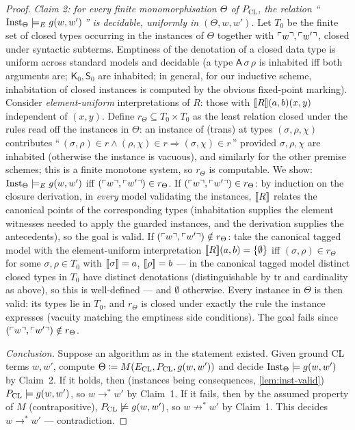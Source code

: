 \begin{proof}
\emph{Claim 2: for every finite monomorphisation $\Theta$ of
$P_{\mathrm{CL}}$, the relation ``\,$\mathrm{Inst}_\Theta
\models_{E} g(w, w')$\,'' is decidable, uniformly in
$(\Theta, w, w')$.}  Let $T_0$ be the finite set of closed types
occurring in the instances of $\Theta$ together with $\ulcorner w \urcorner,
\ulcorner w' \urcorner$, closed under syntactic subterms.  Emptiness of the
denotation of a closed data type is uniform across standard models
and decidable (a type $\mathsf{A}\,\sigma\,\rho$ is inhabited iff
both arguments are; $\mathsf{K}_0, \mathsf{S}_0$ are inhabited; in
general, for our inductive scheme, inhabitation of closed instances
is computed by the obvious fixed-point marking).  Consider
\emph{element-uniform} interpretations of $R$: those with
$[\![ R ]\!](a,b)(x,y)$ independent of $(x,y)$.  Define $r_\Theta
\subseteq T_0 \times T_0$ as the least relation closed under the
rules read off the instances in $\Theta$: an instance of (trans) at
types $(\sigma, \rho, \chi)$ contributes ``\,$(\sigma,\rho) \in r
\wedge (\rho,\chi) \in r \Rightarrow (\sigma,\chi) \in r$\,''
provided $\sigma, \rho, \chi$ are inhabited (otherwise the instance
is vacuous), and similarly for the other premise schemes; this is a
finite monotone system, so $r_\Theta$ is computable.  We show:
$\mathrm{Inst}_\Theta \models_{E} g(w,w')$ iff $(\ulcorner w \urcorner,
\ulcorner w' \urcorner) \in r_\Theta$.  If $(\ulcorner w \urcorner, \ulcorner w' \urcorner) \in r_\Theta$:
by induction on the closure derivation, in \emph{every} model
validating the instances, $[\![ R ]\!]$ relates the canonical points of
the corresponding types (inhabitation supplies the element witnesses
needed to apply the guarded instances, and the derivation supplies
the antecedents), so the goal is valid.  If $(\ulcorner w \urcorner, \ulcorner w' \urcorner)
\notin r_\Theta$: take the canonical tagged model with the
element-uniform interpretation $[\![ R ]\!](a,b) = \{\emptyset\}$ iff $(\sigma,
\rho) \in r_\Theta$ for some $\sigma, \rho \in T_0$ with
$[\![ \sigma ]\!] = a$, $[\![ \rho ]\!] = b$ --- in the canonical tagged
model distinct closed types in $T_0$ have distinct denotations
(distinguishable by $\mathrm{tr}$ and cardinality as above), so this
is well-defined --- and $\emptyset$ otherwise.  Every instance in
$\Theta$ is then valid: its types lie in $T_0$, and $r_\Theta$ is
closed under exactly the rule the instance expresses (vacuity
matching the emptiness side conditions).  The goal fails since
$(\ulcorner w \urcorner, \ulcorner w' \urcorner) \notin r_\Theta$.

\emph{Conclusion.}  Suppose an algorithm as in the statement
existed.  Given ground CL terms $w, w'$, compute $\Theta \coloneqq
M(E_{\mathrm{CL}}, P_{\mathrm{CL}}, g(w,w'))$ and decide
$\mathrm{Inst}_\Theta \models g(w,w')$ by Claim~2.  If it holds,
then (instances being consequences, \cref{lem:inst-valid})
$P_{\mathrm{CL}} \models g(w,w')$, so $w \to^{*} w'$ by Claim~1.
If it fails, then by the assumed property of $M$ (contrapositive),
$P_{\mathrm{CL}} \not\models g(w,w')$, so $w \not\to^{*} w'$ by
Claim~1.  This decides $w \to^{*} w'$ --- contradiction.
\end{proof}

